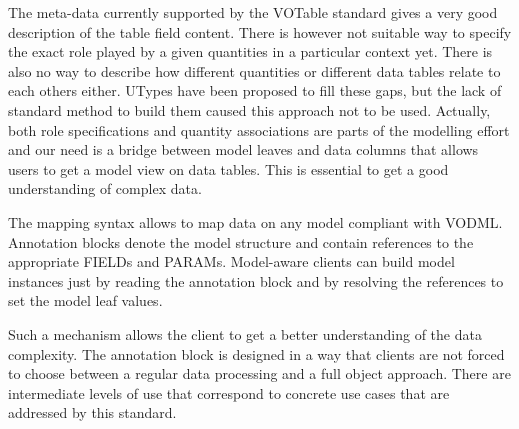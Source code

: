 The meta-data currently supported by the  VOTable standard gives a very good description of the table field content. 
There is however not suitable way to specify the exact role played by a given quantities in a particular context yet.
There is also no way to describe how different quantities or different data tables relate to each others either.
UTypes have been proposed to fill these gaps, but the lack of standard method to build them caused this approach not to be used.
Actually, both role specifications and quantity associations are parts of the modelling effort and our need is a bridge between model leaves and data columns that allows users to get a model view on data tables.
This is essential to get a good  understanding of complex data.

The mapping syntax allows to map data on any model compliant with VODML. 
Annotation blocks denote the model structure and contain references to the appropriate
FIELDs and PARAMs. Model-aware clients can build model instances just by reading the annotation
block and by resolving the references to set the model leaf values. 

Such a mechanism allows the client to get a better understanding of the data complexity.
The annotation block is designed in a way that clients are not forced to choose between a regular data processing and a full object approach.
There are intermediate levels of use that correspond to concrete use cases that are addressed by this standard.



